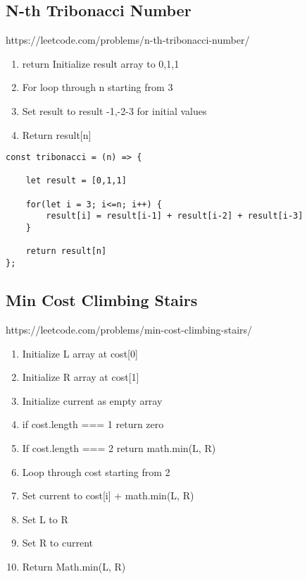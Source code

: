 \documentclass[10pt]{article}
\begin{document}
\medskip %






\pagebreak %
\medskip   
\subsection{N-th Tribonacci Number}
https://leetcode.com/problems/n-th-tribonacci-number/

\begin{enumerate}
	\item return Initialize result array to 0,1,1
	\item For loop through n starting from 3
	\item Set result to result -1,-2-3 for initial values
	\item Return result[n]
\end{enumerate}

\begin{lstlisting}[title=Solution tribonacci, captionpos=t]
const tribonacci = (n) => {
    
    let result = [0,1,1]
    
    for(let i = 3; i<=n; i++) {
        result[i] = result[i-1] + result[i-2] + result[i-3]
    }
    
    return result[n]
};
\end{lstlisting}

\medskip %






\pagebreak %
\medskip   
\subsection{Min Cost Climbing Stairs}
https://leetcode.com/problems/min-cost-climbing-stairs/

\begin{enumerate}
	\item Initialize L array at cost[0]
	\item Initialize R array at cost[1]
	\item Initialize current as empty array
	\item if cost.length === 1 return zero
	\item If cost.length === 2 return math.min(L, R)
	\item Loop through cost starting from 2
	\item Set current to cost[i] + math.min(L, R)
	\item Set L to R
	\item Set R to current
	\item Return Math.min(L, R)
\end{enumerate}
\end{document}
